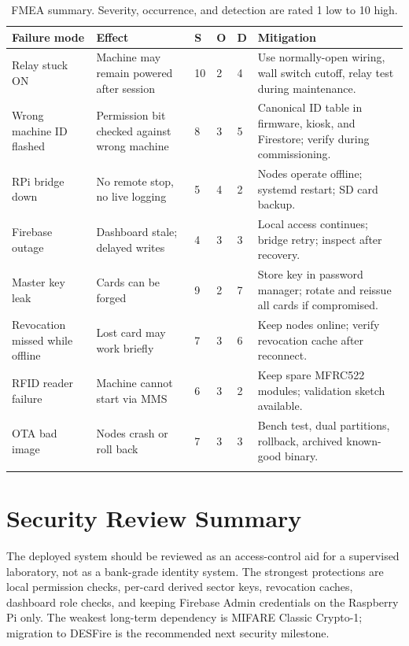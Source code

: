 \begin{longtable}{L{3cm}L{3.8cm}C{1.2cm}C{1.2cm}C{1.2cm}L{4.3cm}}
\toprule
\textbf{Failure mode} & \textbf{Effect} & \textbf{S} & \textbf{O} & \textbf{D} & \textbf{Mitigation} \\
\midrule
\endhead
Relay stuck ON & Machine may remain powered after session & 10 & 2 & 4 & Use normally-open wiring, wall switch cutoff, relay test during maintenance. \\
Wrong machine ID flashed & Permission bit checked against wrong machine & 8 & 3 & 5 & Canonical ID table in firmware, kiosk, and Firestore; verify during commissioning. \\
RPi bridge down & No remote stop, no live logging & 5 & 4 & 2 & Nodes operate offline; systemd restart; SD card backup. \\
Firebase outage & Dashboard stale; delayed writes & 4 & 3 & 3 & Local access continues; bridge retry; inspect after recovery. \\
Master key leak & Cards can be forged & 9 & 2 & 7 & Store key in password manager; rotate and reissue all cards if compromised. \\
Revocation missed while offline & Lost card may work briefly & 7 & 3 & 6 & Keep nodes online; verify revocation cache after reconnect. \\
RFID reader failure & Machine cannot start via MMS & 6 & 3 & 2 & Keep spare MFRC522 modules; validation sketch available. \\
OTA bad image & Nodes crash or roll back & 7 & 3 & 3 & Bench test, dual partitions, rollback, archived known-good binary. \\
\bottomrule
\caption{FMEA summary. Severity, occurrence, and detection are rated 1 low to 10 high.}
\label{tab:fmea}
\end{longtable}

\section{Security Review Summary}

The deployed system should be reviewed as an access-control aid for a supervised laboratory, not as a bank-grade identity system. The strongest protections are local permission checks, per-card derived sector keys, revocation caches, dashboard role checks, and keeping Firebase Admin credentials on the Raspberry Pi only. The weakest long-term dependency is MIFARE Classic Crypto-1; migration to DESFire is the recommended next security milestone.
